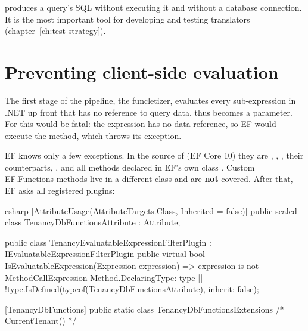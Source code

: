 \begin{tip}
   produces
  a query's SQL without executing it and without a database connection. It is the most
  important tool for developing and testing translators (chapter~\ref{ch:test-strategy}).
\end{tip}

\chapter{Preventing client-side evaluation}\label{ch:preventing-client-side-evaluation}

The first stage of the pipeline, the funcletizer, evaluates every sub-expression in .NET up
front that has no reference to query data.  thus
becomes a parameter. For
 this
would be fatal: the expression has no data reference, so EF would execute the method, which
throws its exception.

EF knows only a few exceptions. In the source of
 (EF Core 10) they are
,
,
, their
 counterparts,
,
 and
all methods declared in EF's own class
. Custom EF.Functions methods live in
a different class and are \textbf{not} covered. After that, EF asks all registered plugins:

\begin{sourcecode}{csharp}
[AttributeUsage(AttributeTargets.Class, Inherited = false)]
public sealed class TenancyDbFunctionsAttribute : Attribute;

public class TenancyEvaluatableExpressionFilterPlugin : IEvaluatableExpressionFilterPlugin
{
    public virtual bool IsEvaluatableExpression(Expression expression)
        => expression is not MethodCallExpression { Method.DeclaringType: { } type }
           || !type.IsDefined(typeof(TenancyDbFunctionsAttribute), inherit: false);
}

[TenancyDbFunctions]
public static class TenancyDbFunctionsExtensions { /* CurrentTenant() */ }
\end{sourcecode}

